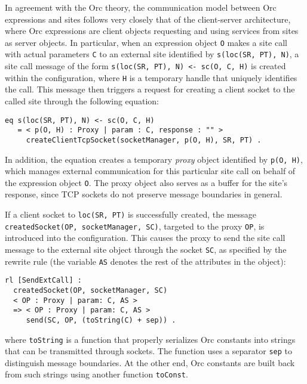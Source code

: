 \documentclass{eptcs}
\begin{document}
In agreement with the Orc theory, the communication model between Orc expressions and sites follows very closely that of the client-server architecture, where Orc expressions are client objects requesting and using services from sites as server objects.
In particular, when an expression object \texttt{O} makes a site call with actual parameters \texttt{C} to an external site identified by \texttt{s(loc(SR, PT), N)}, a site call message of the form  \texttt{s(loc(SR, PT), N) <- sc(O, C, H)} is created within the configuration, where \texttt{H} is a temporary handle that uniquely identifies the call. This message then triggers a request for creating a client socket to the called site through the following equation:

\begin{small}
\begin{verbatim}
eq s(loc(SR, PT), N) <- sc(O, C, H)  
   = < p(O, H) : Proxy | param : C, response : "" >
     createClientTcpSocket(socketManager, p(O, H), SR, PT) .
\end{verbatim}
\end{small}

\noindent In addition, the equation creates a temporary \emph{proxy} object identified by \texttt{p(O, H)}, which manages external communication for this particular site call on behalf of the expression object \texttt{O}. The proxy object also serves as a buffer for the site's response, since TCP sockets do not preserve message boundaries in general.

If a client socket to \texttt{loc(SR, PT)} is successfully created, the message \texttt{ createdSocket(OP, socketManager, SC)}, targeted to the proxy \texttt{OP}, is introduced into the configuration. This causes the proxy to send the site call message to the external site object through the socket \texttt{SC}, as specified by the rewrite rule (the variable \texttt{AS} denotes the rest of the attributes in the object):

\begin{small}
\begin{verbatim}
rl [SendExtCall] :
  createdSocket(OP, socketManager, SC) 
  < OP : Proxy | param: C, AS >
  => < OP : Proxy | param: C, AS > 
     send(SC, OP, (toString(C) + sep)) .
\end{verbatim}
\end{small}

\noindent where \texttt{toString} is a function that properly serializes Orc constants into strings that can be transmitted through sockets. The function uses a separator \texttt{sep} to distinguish message boundaries. 
At the other end, Orc constants are built back from such strings using another function \texttt{toConst}. 
\end{document}
